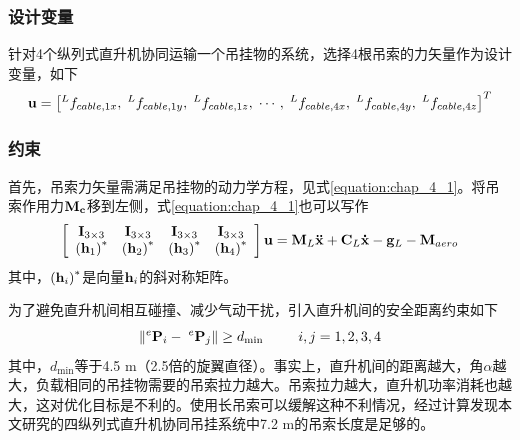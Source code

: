 \subsubsection{设计变量}
针对4个纵列式直升机协同运输一个吊挂物的系统，选择4根吊索的力矢量作为设计变量，如下
\begin{equation}
  {\bf{u}} = \left[ {^L{f_{cable,1x}},{\;^L}{f_{cable,1y}},{\;^L}{f_{cable,1z}},\; \cdots ,{\;^L}{f_{cable,4x}},{\;^L}{f_{cable,4y}},{\;^L}{f_{cable,4z}}} \right]^T
\end{equation}
\subsubsection{约束}
首先，吊索力矢量需满足吊挂物的动力学方程，见式\ref{equation:chap_4_1}。将吊索作用力$\bf{M}_c$移到左侧，式\ref{equation:chap_4_1}也可以写作
\begin{equation}
  \left[ {\begin{array}{*{20}{c}}
    {{{\bf{I}}_{3 \times 3}}}&{{{\bf{I}}_{3 \times 3}}}&{{{\bf{I}}_{3 \times 3}}}&{{{\bf{I}}_{3 \times 3}}}\\
    {{{\left( {{{\bf{h}}_1}} \right)}^*}}&{{{\left( {{{\bf{h}}_2}} \right)}^*}}&{{{\left( {{{\bf{h}}_3}} \right)}^*}}&{{{\left( {{{\bf{h}}_4}} \right)}^*}}
    \end{array}} \right]{\bf{u}} = {{\bf{M}}_L}{\bf{\ddot x}} + {{\bf{C}}_L}{\bf{\dot x}} - {{\bf{g}}_L} - {{\bf{M}}_{aero}}
    \label{equation:chap_4_8}
\end{equation}
其中，${{{\left( {{{\bf{h}}_i}} \right)}^*}}$是向量${{{\bf{h}}_i}}$的斜对称矩阵。

为了避免直升机间相互碰撞、减少气动干扰，引入直升机间的安全距离约束如下
\begin{equation}
  \left\| {^e{{\bf{P}}_i} - {\;^e}{{\bf{P}}_j}} \right\| \ge {d_{\min }}\;\;\;\;\;\;\;\;\;i,j = 1,2,3,4
\end{equation}
其中，$d_{\min}$等于4.5 m（2.5倍的旋翼直径）。事实上，直升机间的距离越大，角$\alpha$越大，负载相同的吊挂物需要的吊索拉力越大。吊索拉力越大，直升机功率消耗也越大，这对优化目标是不利的。使用长吊索可以缓解这种不利情况，经过计算发现本文研究的四纵列式直升机协同吊挂系统中7.2 m的吊索长度是足够的。

